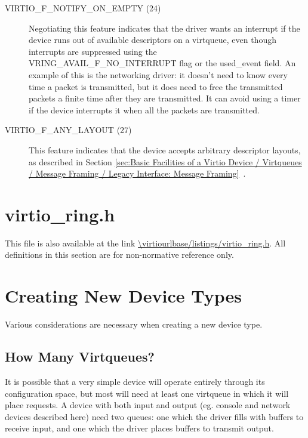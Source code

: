 \begin{description}
\item[VIRTIO_F_NOTIFY_ON_EMPTY (24)] Negotiating this feature
  indicates that the driver wants an interrupt if the device runs
  out of available descriptors on a virtqueue, even though
  interrupts are suppressed using the VRING_AVAIL_F_NO_INTERRUPT
  flag or the used_event field. An example of this is the
  networking driver: it doesn't need to know every time a packet
  is transmitted, but it does need to free the transmitted
  packets a finite time after they are transmitted. It can avoid
  using a timer if the device interrupts it when all the packets
  are transmitted.

\item[VIRTIO_F_ANY_LAYOUT (27)] This feature indicates that the device
  accepts arbitrary descriptor layouts, as described in Section
  \ref{sec:Basic Facilities of a Virtio Device / Virtqueues / Message Framing / Legacy Interface: Message Framing}~.
\end{description}

\chapter{virtio_ring.h}\label{sec:virtio-ring.h}

This file is also available at the link
\url{\virtiourlbase/listings/virtio_ring.h}.
All definitions in this section are for non-normative reference
only.



\chapter{Creating New Device Types}\label{sec:Creating New Device Types}

Various considerations are necessary when creating a new device
type.

\section{How Many Virtqueues?}\label{sec:Creating New Device Types / How Many Virtqueues?}

It is possible that a very simple device will operate entirely
through its configuration space, but most will need at least one
virtqueue in which it will place requests. A device with both
input and output (eg. console and network devices described here)
need two queues: one which the driver fills with buffers to
receive input, and one which the driver places buffers to
transmit output.

